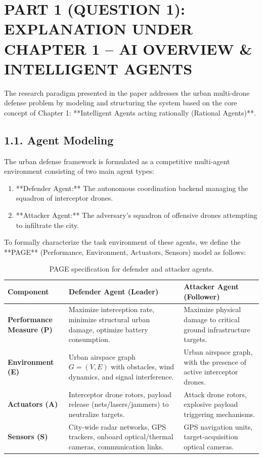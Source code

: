 \documentclass[../main.tex]{subfiles}
\begin{document}

\section{PART 1 (QUESTION 1): EXPLANATION UNDER CHAPTER 1 -- AI OVERVIEW \& INTELLIGENT AGENTS}

The research paradigm presented in the paper \cite{mutzari2025defending} addresses the urban multi-drone defense problem by modeling and structuring the system based on the core concept of Chapter 1: **Intelligent Agents acting rationally (Rational Agents)**.

\subsection{1.1. Agent Modeling}
The urban defense framework is formulated as a competitive multi-agent environment consisting of two main agent types:
\begin{enumerate}
    \item **Defender Agent:** The autonomous coordination backend managing the squadron of interceptor drones.
    \item **Attacker Agent:** The adversary's squadron of offensive drones attempting to infiltrate the city.
\end{enumerate}

To formally characterize the task environment of these agents, we define the **PAGE** (Performance, Environment, Actuators, Sensors) model as follows:

\begin{table}[h!]
\centering
\small
\begin{tabular}{|p{2.5cm}|p{4.5cm}|p{4.5cm}|}
\hline
\textbf{Component} & \textbf{Defender Agent (Leader)} & \textbf{Attacker Agent (Follower)} \\ \hline
\textbf{Performance Measure (P)} & Maximize interception rate, minimize structural urban damage, optimize battery consumption. & Maximize physical damage to critical ground infrastructure targets. \\ \hline
\textbf{Environment (E)} & Urban airspace graph $G=(V,E)$ with obstacles, wind dynamics, and signal interference. & Urban airspace graph, with the presence of active interceptor drones. \\ \hline
\textbf{Actuators (A)} & Interceptor drone rotors, payload release (nets/lasers/jammers) to neutralize targets. & Attack drone rotors, explosive payload triggering mechanisms. \\ \hline
\textbf{Sensors (S)} & City-wide radar networks, GPS trackers, onboard optical/thermal cameras, communication links. & GPS navigation units, target-acquisition optical cameras. \\ \hline
\end{tabular}
\caption{PAGE specification for defender and attacker agents.}
\end{table}
\end{document}
